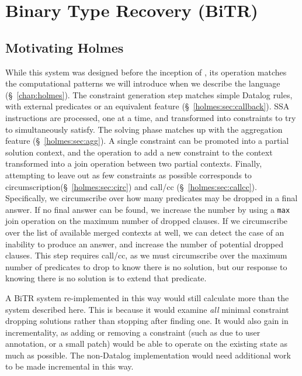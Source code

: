 
\newcommand{\bitr}{{\sc BiTR}}

\chapter{Binary Type Recovery (\bitr)}
\label{chap:bitr}






\section{Motivating Holmes}
While this system was designed before the inception of {\sysname}, its operation matches the computational patterns we will introduce when we describe the language (\S~\ref{chap:holmes}).
The constraint generation step matches simple Datalog rules, with external predicates or an equivalent feature (\S~\ref{holmes:sec:callback}).
SSA instructions are processed, one at a time, and transformed into constraints to try to simultaneously satisfy.
The solving phase matches up with the aggregation feature (\S~\ref{holmes:sec:agg}).
A single constraint can be promoted into a partial solution context, and the operation to add a new constraint to the context transformed into a join operation between two partial contexts.
Finally, attempting to leave out as few constraints as possible corresponds to circumscription(\S~\ref{holmes:sec:circ}) and call/cc (\S~\ref{holmes:sec:callcc}).
Specifically, we circumscribe over how many predicates may be dropped in a final answer.
If no final answer can be found, we increase the number by using a \texttt{max} join operation on the maximum number of dropped clauses.
If we circumscribe over the list of available merged contexts at well, we can detect the case of an inability to produce an answer, and increase the number of potential dropped clauses.
This step requires call/cc, as we must circumscribe over the maximum number of predicates to drop to know there is no solution, but our response to knowing there is no solution is to extend that predicate.

A {\bitr} system re-implemented in this way would still calculate more than the system described here.
This is because it would examine \emph{all} minimal constraint dropping solutions rather than stopping after finding one.
It would also gain in incrementality, as adding or removing a constraint (such as due to user annotation, or a small patch) would be able to operate on the existing state as much as possible.
The non-Datalog implementation would need additional work to be made incremental in this way.

